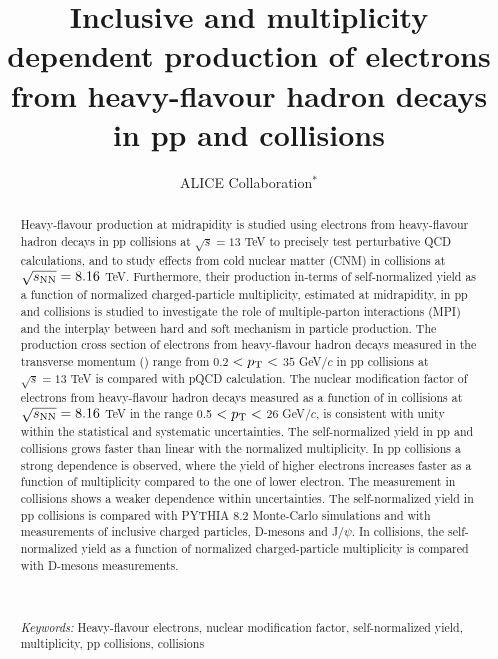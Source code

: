 \documentclass[ALICE,manyauthors]{ALICE_analysis_notes}
\begin{document}
%

\begin{titlepage}
%
\PHdate{\today}
%
\title{ Inclusive and multiplicity dependent production of electrons from heavy-flavour hadron decays in pp and \pPb collisions}
%
\author{ALICE Collaboration$^{*}$}
%
\begin{abstract}

Heavy-flavour production at midrapidity is studied using electrons from heavy-flavour hadron decays in pp collisions at $\sqrt{s}=13$ TeV to precisely test perturbative QCD calculations, and to study effects from cold nuclear matter (CNM) in \pPb collisions at $\sqrt{s_{\rm{NN}}} = 8.16$ TeV. Furthermore, their production in-terms of self-normalized yield as a function of normalized charged-particle multiplicity, estimated at midrapidity, in pp and \pPb collisions is studied to investigate the role of multiple-parton interactions (MPI) and the interplay between hard and soft mechanism in particle production. The production cross section of electrons from heavy-flavour hadron decays measured in the transverse momentum (\pt) range from $0.2$ $< p_{\rm T} <$ $35$ GeV$/c$ in pp collisions at $\sqrt{s}=13$ TeV is compared with pQCD calculation. The nuclear modification factor of electrons from heavy-flavour hadron decays measured as a function of \pt in \pPb collisions at $\sqrt{s_{\rm{NN}}} = 8.16$ TeV in the range 0.5 $< p_{\rm T} <$ 26 GeV/$c$, is consistent with unity within the statistical and systematic uncertainties. The self-normalized yield in pp and \pPb collisions grows faster than linear with the normalized multiplicity. In pp collisions a strong \pt dependence is observed, where the yield of higher \pt electrons increases faster as a function of multiplicity compared to the one of lower \pt electron. The measurement in \pPb collisions shows a weaker \pt dependence within uncertainties. The self-normalized yield in pp collisions is compared with PYTHIA 8.2 Monte-Carlo simulations and with measurements of inclusive charged particles, D-mesons and J/$\psi$. In \pPb collisions, the self-normalized yield as a function of normalized charged-particle multiplicity is compared with D-mesons measurements. 


\\
\\
{\it Keywords:} Heavy-flavour electrons, nuclear modification factor, self-normalized yield, multiplicity, pp collisions, \pPb collisions

\end{abstract}
\end{titlepage}
\end{document}
